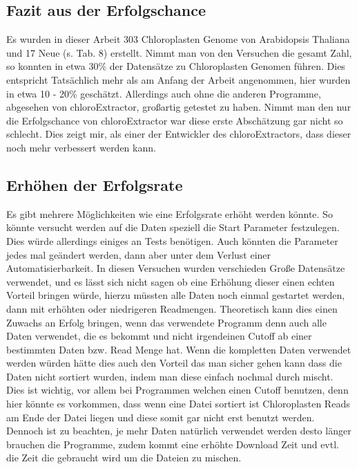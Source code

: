 \documentclass{scrartcl}
\begin{document}
\subsection{Fazit aus der Erfolgschance}
\label{sec-5-3}
Es wurden in dieser Arbeit 303 Chloroplasten Genome von Arabidopsis Thaliana und 17 Neue (s. Tab. 8) erstellt. Nimmt man von den Versuchen die gesamt Zahl, so konnten in etwa 30\% der Datensätze zu Chloroplasten Genomen führen.
Dies entspricht Tatsächlich mehr als am Anfang der Arbeit angenommen, hier wurden in etwa 10 - 20\% geschätzt. Allerdings auch ohne die anderen Programme, abgesehen von chloroExtractor, großartig getestet zu haben. Nimmt man 
den nur die Erfolgschance von chloroExtractor war diese erste Abschätzung gar nicht so schlecht. Dies zeigt mir, als einer der Entwickler des chloroExtractors, dass dieser noch mehr verbessert werden kann.  
\subsection{Erhöhen der Erfolgsrate}
\label{sec-5-4}
Es gibt mehrere Möglichkeiten wie eine Erfolgsrate erhöht werden könnte. So könnte versucht werden auf die Daten speziell die Start Parameter festzulegen. Dies würde allerdings einiges an Tests benötigen. 
Auch könnten die Parameter jedes mal 
geändert werden, dann aber unter dem Verlust einer Automatisierbarkeit. In diesen Versuchen wurden verschieden Große Datensätze verwendet, und es lässt sich nicht sagen ob eine Erhöhung dieser einen echten Vorteil bringen würde, 
hierzu müssten alle Daten noch einmal gestartet werden, dann mit erhöhten oder niedrigeren Readmengen. Theoretisch kann dies einen Zuwachs an Erfolg bringen, wenn das verwendete Programm denn auch alle Daten verwendet, 
die es bekommt und nicht
irgendeinen Cutoff ab einer bestimmten Daten bzw. Read Menge hat. Wenn die kompletten Daten verwendet werden würden hätte dies auch den Vorteil das man sicher gehen kann dass die Daten nicht sortiert wurden, indem man diese
einfach nochmal durch mischt. Dies ist wichtig, vor allem bei Programmen welchen einen Cutoff benutzen, denn hier könnte es vorkommen, dass wenn eine Datei sortiert ist Chloroplasten Reads am Ende der Datei liegen und diese somit
gar nicht erst benutzt werden. Dennoch ist zu beachten, je mehr Daten natürlich verwendet werden desto länger brauchen die Programme, zudem kommt eine erhöhte Download Zeit und evtl. die Zeit die gebraucht wird um die Dateien zu 
mischen. 
\end{document}
